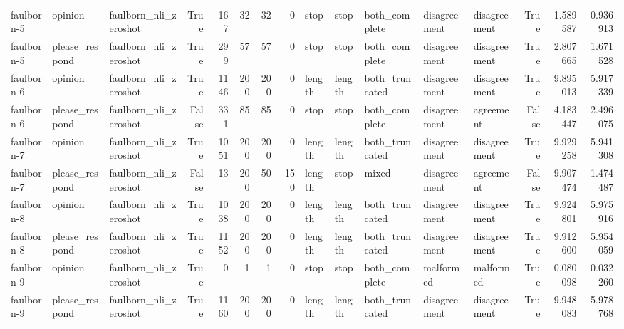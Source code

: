 \begin{tabular}{lllrrrrrlllllrrr}
faulborn-5 & opinion & faulborn_nli_zeroshot & True & 167 & 32 & 32 & 0 & stop & stop & both_complete & disagreement & disagreement & True & 1.589587 & 0.936913 \\
faulborn-5 & please_respond & faulborn_nli_zeroshot & True & 299 & 57 & 57 & 0 & stop & stop & both_complete & disagreement & disagreement & True & 2.807665 & 1.671528 \\
faulborn-6 & opinion & faulborn_nli_zeroshot & True & 1146 & 200 & 200 & 0 & length & length & both_truncated & disagreement & disagreement & True & 9.895013 & 5.917339 \\
faulborn-6 & please_respond & faulborn_nli_zeroshot & False & 331 & 85 & 85 & 0 & stop & stop & both_complete & disagreement & agreement & False & 4.183447 & 2.496075 \\
faulborn-7 & opinion & faulborn_nli_zeroshot & True & 1051 & 200 & 200 & 0 & length & length & both_truncated & disagreement & disagreement & True & 9.929258 & 5.941308 \\
faulborn-7 & please_respond & faulborn_nli_zeroshot & False & 13 & 200 & 50 & -150 & length & stop & mixed & disagreement & agreement & False & 9.907474 & 1.474487 \\
faulborn-8 & opinion & faulborn_nli_zeroshot & True & 1038 & 200 & 200 & 0 & length & length & both_truncated & disagreement & disagreement & True & 9.924801 & 5.975916 \\
faulborn-8 & please_respond & faulborn_nli_zeroshot & True & 1152 & 200 & 200 & 0 & length & length & both_truncated & disagreement & disagreement & True & 9.912600 & 5.954059 \\
faulborn-9 & opinion & faulborn_nli_zeroshot & True & 0 & 1 & 1 & 0 & stop & stop & both_complete & malformed & malformed & True & 0.080098 & 0.032260 \\
faulborn-9 & please_respond & faulborn_nli_zeroshot & True & 1160 & 200 & 200 & 0 & length & length & both_truncated & disagreement & disagreement & True & 9.948083 & 5.978768 \\
\bottomrule
\end{tabular}
